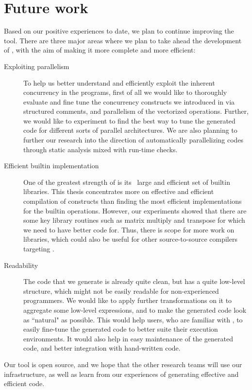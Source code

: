 \section{Future work}
Based on our positive experiences to date,  we plan to continue
improving the \mixten tool.  There are three major areas where we plan to take
ahead the development of \mixten, with the aim of making it more complete and
more efficient:
\begin{description}

\item[Exploiting parallelism] To help us better understand and efficiently
exploit the inherent concurrency in the \matlab programs, first of all we would 
like to thoroughly evaluate and fine tune
the concurrency constructs we introduced in \matlab via structured comments, and
parallelism of the vectorized operations. Further, we would like to experiment
to find the best way to tune the generated code for different
sorts of parallel architectures. We are also planning to further our research
into the direction of automatically parallelizing \matlab codes through
static analysis mixed with run-time checks.   

\item[Efficient builtin implementation] One of the greatest strength of
\matlab is its \ large and efficient set of
builtin libraries. This thesis concentrates more on effective and efficient
compilation of \matlab constructs than finding the most efficient
\xten implementations for the builtin operations. However, our experiments showed that there
are some key library routines such as matrix multiply and transpose for
which we need to have better \xten code for. Thus, there is scope for more
work on \xten libraries, which could also be useful for other
source-to-source compilers targeting \xten.

\item[Readability] The code that we generate is already quite
clean, but has a quite low-level structure, which might not be easily readable for
non-experienced \xten programmers. We would like to apply further transformations on it to
aggregate some low-level expressions, and to make the generated code
look as ``natural" as possible. This would help \mixten users, who are familiar
with \xten, to easily
fine-tune the generated \xten code to better suite their execution environments.
It would also help in easy maintenance of the generated \xten code, and better
integration with hand-written \xten code.   

\end{description}

Our tool is open source, and we hope that the other research teams will use
our infrastructure, as well as learn from our experiences of generating
effective and efficient \xten code.
